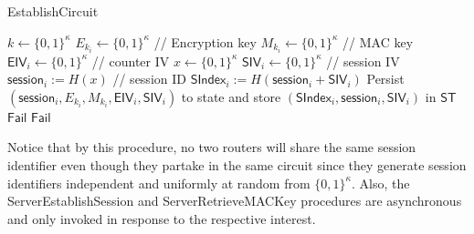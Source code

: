 \documentclass[10pt]{article}
\begin{document}


\begin{algorithm}[ht!]
\caption{{\sf EstablishCircuit}}
  \begin{algorithmic}[1]

  \State $k \gets \{0,1\}^{\kappa}$
  \State $E_{k_i} \gets \{0,1\}^{\kappa}$ // Encryption key
  \State $M_{k_i} \gets \{0,1\}^{\kappa}$ // MAC key
  \State $\mathsf{EIV}_i \gets \{0,1\}^{\kappa}$     // counter IV
  \State $x \gets \{0,1\}^{\kappa}$
  \State $\mathsf{SIV}_i \gets \{0,1\}^{\kappa}$ // session IV
  \State $\mathsf{session}_i := H(x)$ // session ID
  \State $\mathsf{SIndex}_i := H(\mathsf{session}_i + \mathsf{SIV}_i)$
  \State Persist $(\mathsf{session}_i, E_{k_i}, M_{k_i}, \mathsf{EIV}_i, \mathsf{SIV}_i)$ to state and store $(\mathsf{SIndex}_i, \mathsf{session}_i, \mathsf{SIV}_i)$ in $\mathsf{ST}$
\EndFor
      \State \Return $\mathsf{Fail}$
    \EndIf
  \Else
      \State \Return $\mathsf{Fail}$
    \EndIf
  \EndIf
\EndFor
  \end{algorithmic}
\end{algorithm}

Notice that by this procedure, no two routers will share the same session identifier even though they partake in the same circuit since they generate session identifiers independent and uniformly at random from $\{0,1\}^{\kappa}$. Also, the {\sf ServerEstablishSession} and {\sf ServerRetrieveMACKey} procedures are asynchronous and only invoked in response to the respective interest.
\end{document}
